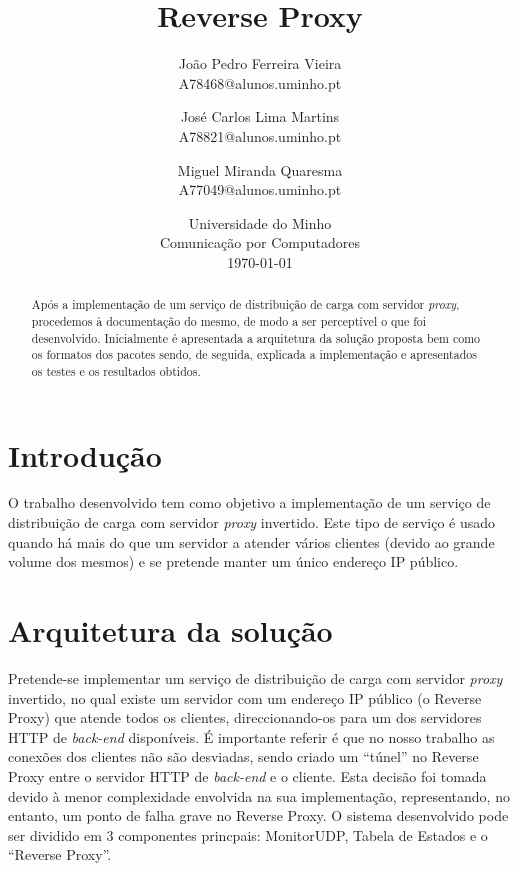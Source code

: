 \documentclass{article}
\begin{document}
\title{\textbf{Reverse Proxy}}
\author{João Pedro Ferreira Vieira\\
		A78468@alunos.uminho.pt \and
		José Carlos Lima Martins\\
        A78821@alunos.uminho.pt \and
        Miguel Miranda Quaresma\\
        A77049@alunos.uminho.pt}
\date{Universidade do Minho\\
	  Comunicação por Computadores\\[2ex]%
      \today}
\maketitle

\begin{abstract}
Após a implementação de um serviço de distribuição de carga com servidor \textit{proxy}, procedemos à documentação do mesmo, de modo a ser perceptível o que foi desenvolvido. Inicialmente é apresentada a arquitetura da solução proposta bem como os formatos dos pacotes sendo, de seguida, explicada a implementação e apresentados os testes e os resultados obtidos.
\end{abstract}

\section{Introdução}
O trabalho desenvolvido tem como objetivo a implementação de um serviço de distribuição de carga com servidor \textit{proxy} invertido. Este tipo de serviço é usado quando há mais do que um servidor a atender vários clientes (devido ao grande volume dos mesmos) e se pretende manter um único endereço IP público.

\section{Arquitetura da solução}
Pretende-se implementar um serviço de distribuição de carga com servidor \textit{proxy} invertido, no qual existe um servidor com um endereço IP público (o Reverse Proxy) que atende todos os clientes, direccionando-os para um dos servidores HTTP de \textit{back-end} disponíveis. 
É importante referir é que no nosso trabalho as conexões dos clientes não são desviadas, sendo criado um ``túnel'' no Reverse Proxy entre o servidor HTTP de \textit{back-end} e o cliente. Esta decisão foi tomada devido à menor complexidade envolvida na sua implementação, representando, no entanto, um ponto de falha grave no Reverse Proxy.
O sistema desenvolvido pode ser dividido em 3 componentes princpais: MonitorUDP, Tabela de Estados e o ``Reverse Proxy''. 
\end{document}
